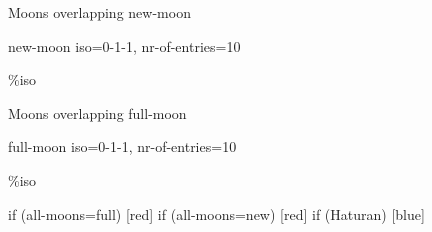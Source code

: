 \documentclass[paper=landscape]{scrartcl}
\begin{document}
\begin{multicols}{2}
Moons overlapping new-moon
\begin{itemize}
\CompareMoons { \Surios , \Eria } { new-moon } { iso=0-1-1, nr-of-entries=10 } 
  {
    \item {}  \%{iso} 
 }
 \end{itemize}
 
Moons overlapping full-moon 
\begin{itemize}
\CompareMoons { \Surios , \Eria } { full-moon } { iso=0-1-1, nr-of-entries=10 } 
  {
    \item {}  \%{iso} 
 }
 \end{itemize}
 
\end{multicols}

\newpage

  {
    if (all-moons=full) [red]
    if (all-moons=new) [red]
    if (Haturan) [blue]
  }
\end{document}
